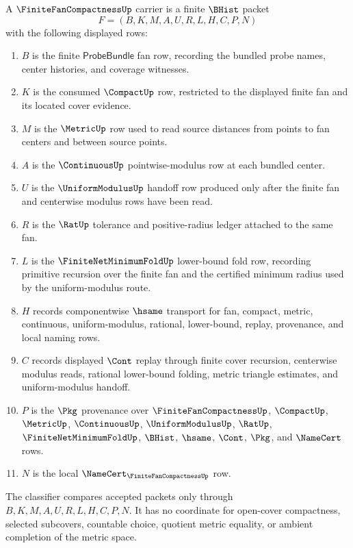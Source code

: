 \begin{definition}\label{def:finite-fan-compactness-carrier}
A $\FiniteFanCompactnessUp$ carrier is a finite $\BHist$ packet
$$
F=(B,K,M,A,U,R,L,H,C,P,N)
$$
with the following displayed rows:
\begin{enumerate}
\item $B$ is the finite $\mathsf{ProbeBundle}$ fan row, recording the bundled probe names, center histories, and coverage witnesses.
\item $K$ is the consumed $\CompactUp$ row, restricted to the displayed finite fan and its located cover evidence.
\item $M$ is the $\MetricUp$ row used to read source distances from points to fan centers and between source points.
\item $A$ is the $\ContinuousUp$ pointwise-modulus row at each bundled center.
\item $U$ is the $\UniformModulusUp$ handoff row produced only after the finite fan and centerwise modulus rows have been read.
\item $R$ is the $\RatUp$ tolerance and positive-radius ledger attached to the same fan.
\item $L$ is the $\FiniteNetMinimumFoldUp$ lower-bound fold row, recording primitive recursion over the finite fan and the certified minimum radius used by the uniform-modulus route.
\item $H$ records componentwise $\hsame$ transport for fan, compact, metric, continuous, uniform-modulus, rational, lower-bound, replay, provenance, and local naming rows.
\item $C$ records displayed $\Cont$ replay through finite cover recursion, centerwise modulus reads, rational lower-bound folding, metric triangle estimates, and uniform-modulus handoff.
\item $P$ is the $\Pkg$ provenance over $\FiniteFanCompactnessUp$, $\CompactUp$, $\MetricUp$, $\ContinuousUp$, $\UniformModulusUp$, $\RatUp$, $\FiniteNetMinimumFoldUp$, $\BHist$, $\hsame$, $\Cont$, $\Pkg$, and $\NameCert$ rows.
\item $N$ is the local $\NameCert_{\FiniteFanCompactnessUp}$ row.
\end{enumerate}
The classifier compares accepted packets only through $B,K,M,A,U,R,L,H,C,P,N$. It has no coordinate for open-cover compactness, selected subcovers, countable choice, quotient metric equality, or ambient completion of the metric space.
\end{definition}


